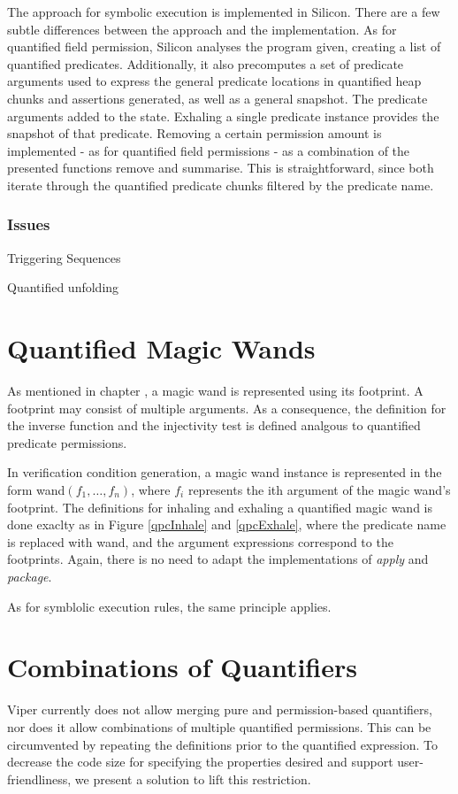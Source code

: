 \documentclass[12pt]{article}
\begin{document}
The approach for symbolic execution is implemented in Silicon. There are a few subtle differences between the approach and the implementation. As for quantified field permission, Silicon analyses the program given, creating a list of quantified predicates. Additionally, it also precomputes a set of predicate arguments used to express the general predicate locations in quantified heap chunks and assertions generated, as well as a general snapshot. The predicate arguments added to the state.
Exhaling a single predicate instance provides the snapshot of that predicate. Removing a certain permission amount is implemented - as for quantified field permissions - as a combination of the presented functions remove and summarise. This is straightforward, since both iterate through the quantified predicate chunks filtered by the predicate name.

\subsubsection{Issues}
Triggering Sequences

Quantified unfolding

\section{Quantified Magic Wands}
\label{qmw}
As mentioned in chapter , a magic wand is represented using its footprint. A footprint may consist of multiple arguments. As a consequence, the definition for the inverse function and the injectivity test is defined analgous to quantified predicate permissions.

In verification condition generation, a magic wand instance is represented in the form wand\( (f_1, \dots, f_n) \), where \(f_i\) represents the ith argument of the magic wand's footprint. The definitions for inhaling and exhaling a quantified magic wand is done exaclty as in Figure \ref{qpcInhale} and \ref{qpcExhale}, where the predicate name is replaced with wand, and the argument expressions correspond to the footprints.
Again, there is no need to adapt the implementations of \textit{apply} and \textit{package}.

As for symblolic execution rules, the same principle applies.%

\section{Combinations of Quantifiers}
\label{rewriting}
Viper currently does not allow merging pure and permission-based quantifiers, nor does it allow combinations of multiple quantified permissions. This can be circumvented by repeating the definitions prior to the quantified expression.
To decrease the code size for specifying the properties desired and support user-friendliness, we present a solution to lift this restriction.
\end{document}
